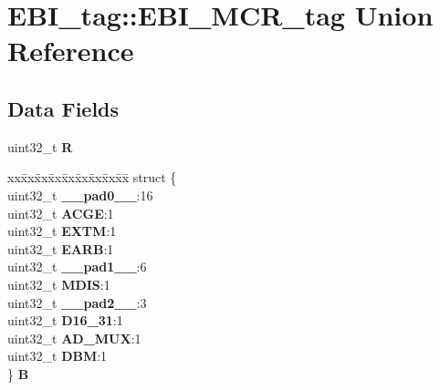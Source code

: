 \hypertarget{unionEBI__tag_1_1EBI__MCR__tag}{}\section{E\+B\+I\+\_\+tag\+::E\+B\+I\+\_\+\+M\+C\+R\+\_\+tag Union Reference}
\label{unionEBI__tag_1_1EBI__MCR__tag}
\subsection*{Data Fields}
\begin{DoxyCompactItemize}
\item 
\mbox{\label{unionEBI__tag_1_1EBI__MCR__tag_a024ec3bfc34607a1e4e0eb75126bc7be}} 
uint32\+\_\+t {\bfseries R}
\item 
\mbox{\label{unionEBI__tag_1_1EBI__MCR__tag_a420af77e86c2fce4c1885291bc187ba9}} 
\begin{tabbing}
xx\=xx\=xx\=xx\=xx\=xx\=xx\=xx\=xx\=\kill
struct \{\\
\>uint32\_t {\bfseries \_\_pad0\_\_}:16\\
\>uint32\_t {\bfseries ACGE}:1\\
\>uint32\_t {\bfseries EXTM}:1\\
\>uint32\_t {\bfseries EARB}:1\\
\>uint32\_t {\bfseries \_\_pad1\_\_}:6\\
\>uint32\_t {\bfseries MDIS}:1\\
\>uint32\_t {\bfseries \_\_pad2\_\_}:3\\
\>uint32\_t {\bfseries D16\_31}:1\\
\>uint32\_t {\bfseries AD\_MUX}:1\\
\>uint32\_t {\bfseries DBM}:1\\
\} {\bfseries B}\\


\end{tabbing}
\end{DoxyCompactItemize}
